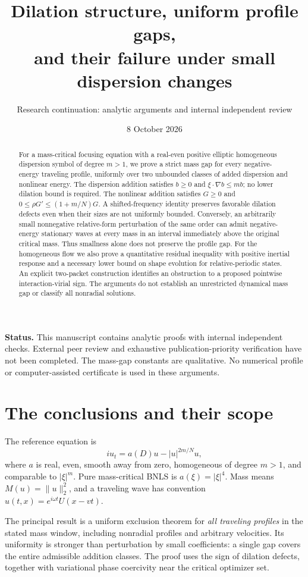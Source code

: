 \documentclass[11pt,a4paper]{article}
\title{Dilation structure, uniform profile gaps,\\and their failure under small dispersion changes}
\author{Research continuation: analytic arguments and internal independent review}
\date{8 October 2026}
\theoremstyle{remark}\newtheorem{remark}[theorem]{Remark}
\begin{document}
\maketitle
\begin{abstract}
For a mass-critical focusing equation with a real-even positive elliptic homogeneous dispersion symbol of degree $m>1$, we prove a strict mass gap for every negative-energy traveling profile, uniformly over two unbounded classes of added dispersion and nonlinear energy. The dispersion addition satisfies $b\ge0$ and $\xi\cdot\nabla b\le mb$; no lower dilation bound is required. The nonlinear addition satisfies $G\ge0$ and $0\le\rho G'\le(1+m/N)G$. A shifted-frequency identity preserves favorable dilation defects even when their sizes are not uniformly bounded. Conversely, an arbitrarily small nonnegative relative-form perturbation of the same order can admit negative-energy stationary waves at every mass in an interval immediately above the original critical mass. Thus smallness alone does not preserve the profile gap. For the homogeneous flow we also prove a quantitative residual inequality with positive inertial response and a necessary lower bound on shape evolution for relative-periodic states. An explicit two-packet construction identifies an obstruction to a proposed pointwise interaction-virial sign. The arguments do not establish an unrestricted dynamical mass gap or classify all nonradial solutions.
\end{abstract}
\noindent\textbf{Status.} This manuscript contains analytic proofs with internal independent checks. External peer review and exhaustive publication-priority verification have not been completed. The mass-gap constants are qualitative. No numerical profile or computer-assisted certificate is used in these arguments.

\section*{The conclusions and their scope}
The reference equation is
\[
 i u_t=a(D)u-|u|^{2m/N}u,
\]
where $a$ is real, even, smooth away from zero, homogeneous of degree $m>1$, and comparable to $|\xi|^m$. Pure mass-critical BNLS is $a(\xi)=|\xi|^4$. Mass means $M(u)=\|u\|_2^2$, and a traveling wave has convention $u(t,x)=e^{i\omega t}U(x-vt)$.

The principal result is a uniform exclusion theorem for \emph{all traveling profiles} in the stated mass window, including nonradial profiles and arbitrary velocities. Its uniformity is stronger than perturbation by small coefficients: a single gap covers the entire admissible addition classes. The proof uses the sign of dilation defects, together with variational phase coercivity near the critical optimizer set.
\end{document}
